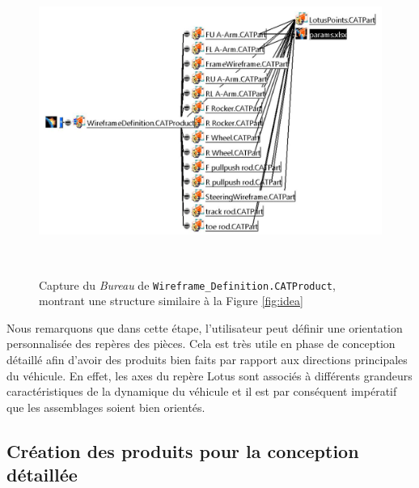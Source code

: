 \begin{figure}[H]
    \centering
    \includegraphics[height=10cm]{img/Desk_wireframe_definition.JPG}
    \caption{Capture du \textit{Bureau} de \texttt{Wireframe\_Definition.CATProduct}, montrant une structure similaire à la Figure \ref{fig:idea}}
    \label{fig:desk_wireframe_definition}
\end{figure}

\par Nous remarquons que dans cette étape, l'utilisateur peut définir une orientation personnalisée des repères des pièces. Cela est très utile en phase de conception détaillé afin d'avoir des produits bien faits par rapport aux directions principales du véhicule. En effet, les axes du repère Lotus sont associés à différents grandeurs caractéristiques de la dynamique du véhicule et il est par conséquent impératif que les assemblages soient bien orientés.

\subsection{Création des produits pour la conception détaillée} %

